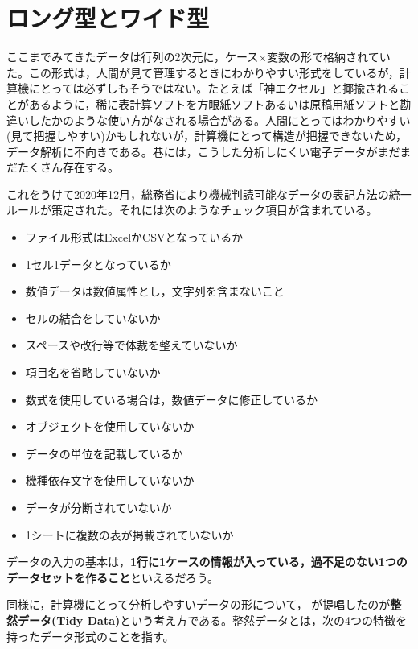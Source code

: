 \documentclass[
  a4paper,
]{ltjsbook}
\providecommand{\tightlist}{%
  \setlength{\itemsep}{0pt}\setlength{\parskip}{0pt}}\usepackage{longtable,booktabs,array}
\begin{document}
\section{ロング型とワイド型}\label{ux30edux30f3ux30b0ux578bux3068ux30efux30a4ux30c9ux578b}

ここまでみてきたデータは行列の2次元に，ケース\(\times\)変数の形で格納されていた。この形式は，人間が見て管理するときにわかりやすい形式をしているが，計算機にとっては必ずしもそうではない。たとえば「神エクセル」と揶揄されることがあるように，稀に表計算ソフトを方眼紙ソフトあるいは原稿用紙ソフトと勘違いしたかのような使い方がなされる場合がある。人間にとってはわかりやすい(見て把握しやすい)かもしれないが，計算機にとって構造が把握できないため，データ解析に不向きである。巷には，こうした分析しにくい電子データがまだまだたくさん存在する。

これをうけて2020年12月，総務省により機械判読可能なデータの表記方法の統一ルールが策定された\autocite{soumu}。それには次のようなチェック項目が含まれている。

\begin{itemize}
\tightlist
\item
  ファイル形式はExcelかCSVとなっているか
\item
  1セル1データとなっているか
\item
  数値データは数値属性とし，文字列を含まないこと
\item
  セルの結合をしていないか
\item
  スペースや改行等で体裁を整えていないか
\item
  項目名を省略していないか
\item
  数式を使用している場合は，数値データに修正しているか
\item
  オブジェクトを使用していないか
\item
  データの単位を記載しているか
\item
  機種依存文字を使用していないか
\item
  データが分断されていないか
\item
  1シートに複数の表が掲載されていないか
\end{itemize}

データの入力の基本は，\textbf{1行に1ケースの情報が入っている，過不足のない1つのデータセットを作ること}といえるだろう。

同様に，計算機にとって分析しやすいデータの形について，\textcite{Hadley2014}
が提唱したのが\textbf{整然データ(Tidy
Data)}という考え方である。整然データとは，次の4つの特徴を持ったデータ形式のことを指す。
\end{document}

